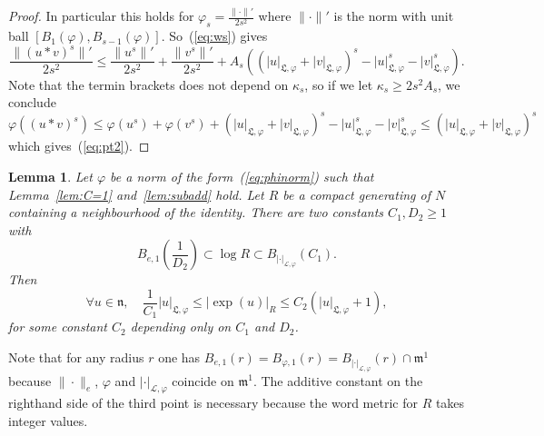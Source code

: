 \documentclass[11pt,leqno]{article}
\theoremstyle{plain}
\newtheorem{lemma}[theorem]{Lemma}
\theoremstyle{definition}
\theoremstyle{remark}
\numberwithin{equation}{section}
\begin{document}
\begin{proof}
In particular this holds for $\varphi_s=\frac{\|\cdot\|'}{2s^2}$ where $\|\cdot\|'$ is the norm with unit ball $[B_1(\varphi),B_{s-1}(\varphi)]$. So~(\ref{eq:ws}) gives
\[
\frac{\|(u\ast v)^s\|'}{2s^2} \le \frac{\|u^s\|'}{2s^2}+\frac{\|v^s\|'}{2s^2}+A_s\left((|u|_{\mathfrak{L},\varphi}+|v|_{\mathfrak{L},\varphi})^s-|u|_{\mathfrak{L},\varphi}^s-|v|_{\mathfrak{L},\varphi}^s \right).
\]
Note that the termin brackets does not depend on $\kappa_s$, so
if we let $\kappa_s\ge2s^2A_s$, we conclude
\[
\varphi\left( (u\ast v)^s\right) \le \varphi(u^s)+\varphi(v^s)+(|u|_{\mathfrak{L},\varphi}+|v|_{\mathfrak{L},\varphi})^s-|u|_{\mathfrak{L},\varphi}^s-|v|_{\mathfrak{L},\varphi}^s \le (|u|_{\mathfrak{L},\varphi}+|v|_{\mathfrak{L},\varphi})^s
\]
which gives~(\ref{eq:pt2}).
\end{proof}



\begin{lemma}\label{lem:homogene-word} Let $\varphi$ be a norm of the form~(\ref{eq:phinorm}) such that Lemma~\ref{lem:C=1} and~\ref{lem:subadd} hold. Let $R$ be a compact generating of $N$ containing a neighbourhood of the identity. There are two constants $C_1,D_2\ge 1$ with
\begin{equation}\label{eq:C1D2}
B_{e,1}\left(\frac{1}{D_2}\right) \subset \log R \subset B_{|\cdot|_{\mathcal{L},\varphi}}(C_1).
\end{equation}
Then
\[
\forall u \in \mathfrak{n}, \quad \frac{1}{C_1} |u|_{\mathfrak{L},\varphi}\le  |\exp(u)|_R \le C_2\left(|u|_{\mathfrak{L},\varphi} +1\right),
\]
for some constant $C_2$ depending only on $C_1$ and $D_2$.
\end{lemma}

Note that for any radius $r$ one has $B_{e,1}(r)=B_{\varphi,1}(r)=B_{|\cdot|_{\mathcal{L},\varphi}}(r)\cap \mathfrak{m}^1$ because $\|\cdot\|_e$, $\varphi$  and $|\cdot|_{\mathcal{L},\varphi}$ coincide on $\mathfrak{m}^1$.
The additive constant on the righthand side of the third point is necessary because the word metric for $R$ takes integer values.
\end{document}
